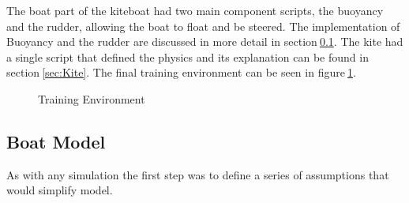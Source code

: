 
The boat part of the kiteboat had two main component scripts, the buoyancy and the rudder, allowing the boat to float and be steered. The implementation of Buoyancy and the rudder are discussed in more detail in section$~$\ref{sec:Boat}. The kite had a single script that defined the physics and its explanation can be found in section$~$\ref{sec:Kite}. The final training environment can be seen in figure$~$\ref{training_enviroment}.

\begin{figure}[h]
    \centering
    \caption{Training Environment}\label{training_enviroment}
\end{figure}


\subsection{Boat Model}\label{sec:Boat}

As with any simulation the first step was to define a series of assumptions that would simplify model.

